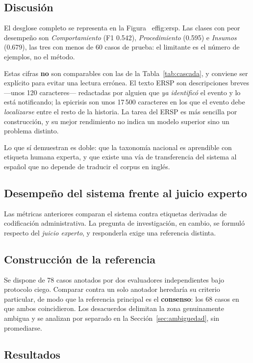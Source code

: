 \documentclass[conference]{IEEEtran}
\begin{document}
\subsection{Discusión}
El desglose completo se representa en la Figura~
ef{fig:ersp}. Las clases
con peor desempeño son \emph{Comportamiento} (F1 0.542),
\emph{Procedimiento} (0.595) e \emph{Insumos} (0.679), las tres con menos de 60
casos de prueba: el limitante es el número de ejemplos, no el método.

Estas cifras \textbf{no} son comparables con las de la
Tabla~\ref{tab:cascada}, y conviene ser explícito para evitar una lectura
errónea. El texto ERSP son descripciones breves ---unos 120 caracteres---
redactadas por alguien que \emph{ya identificó} el evento y lo está notificando;
la epicrisis son unos 17\,500 caracteres en los que el evento debe
\emph{localizarse} entre el resto de la historia. La tarea del ERSP es más
sencilla por construcción, y su mejor rendimiento no indica un modelo
superior sino un problema distinto.

Lo que sí demuestran es doble: que la taxonomía nacional es aprendible con
etiqueta humana experta, y que existe una vía de transferencia del sistema al
español que no depende de traducir el corpus en inglés.

\subsection{Desempeño del sistema frente al juicio experto}
\label{sec:experto}

Las métricas anteriores comparan el sistema contra etiquetas derivadas de
codificación administrativa. La pregunta de investigación, en cambio, se
formuló respecto del \emph{juicio experto}, y responderla exige una
referencia distinta.

\subsection{Construcción de la referencia}
Se dispone de 78 casos anotados por dos
evaluadores independientes bajo protocolo ciego. Comparar contra un solo
anotador heredaría su criterio particular, de modo que la referencia principal
es el \textbf{consenso}: los 68 casos en que ambos
coincidieron. Los desacuerdos delimitan la zona genuinamente ambigua y se
analizan por separado en la Sección~\ref{sec:ambiguedad}, sin promediarse.

\subsection{Resultados}
\end{document}
